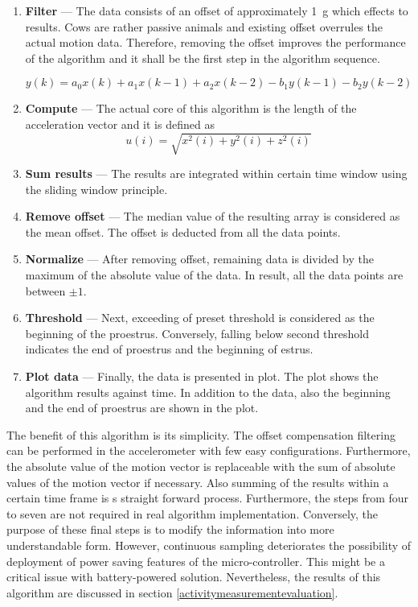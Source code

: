 \documentclass[english,12pt,a4paper,pdftex,elec,utf8]{aaltothesis}
\begin{document}
\begin{enumerate}
\item \textbf{Filter} --- The data consists of an offset of approximately \SI{1}{\gram} which effects to results. Cows are rather passive animals and existing offset overrules the actual motion data. Therefore, removing the offset improves the performance of the algorithm and it shall be the first step in the algorithm sequence.

\begin{equation}
y(k) = a_0 x(k) + a_1 x(k-1) + a_2 x(k-2) - b_1 y(k-1) - b_2 y(k-2)
\end{equation}

\item \textbf{Compute} --- The actual core of this algorithm is the length of the acceleration vector and it is defined as \begin{equation}
u(i) = \sqrt{x^2(i) + y^2(i) + z^2(i)} 
\end{equation}

\item \textbf{Sum results} --- The results are integrated within certain time window using the sliding window principle.

\item \textbf{Remove offset} --- The median value of the resulting array is considered as the mean offset. The offset is deducted from all the data points.

\item \textbf{Normalize} --- After removing offset, remaining data is divided by the maximum of the absolute value of the data. In result, all the data points are between $\pm 1$.

\item \textbf{Threshold} --- Next, exceeding of preset threshold is considered as the beginning of the proestrus. Conversely, falling below second threshold indicates the end of proestrus and the beginning of estrus.

\item \textbf{Plot data} --- Finally, the data is presented in plot. The plot shows the algorithm results against time. In addition to the data, also the beginning and the end of proestrus are shown in the plot.

\end{enumerate}
The benefit of this algorithm is its simplicity. The offset compensation filtering can be performed in the accelerometer with few easy configurations. Furthermore, the absolute value of the motion vector is replaceable with the sum of absolute values of the motion vector if necessary. Also summing of the results within a certain time frame is s straight forward process. Furthermore, the steps from four to seven are not required in real algorithm implementation. Conversely, the purpose of these final steps is to modify the information into more understandable form. However, continuous sampling deteriorates the possibility of deployment of power saving  features of the micro-controller. This might be a critical issue with battery-powered solution. Nevertheless, the results of this algorithm are discussed in section \ref{activitymeasurementevaluation}. 
\end{document}
